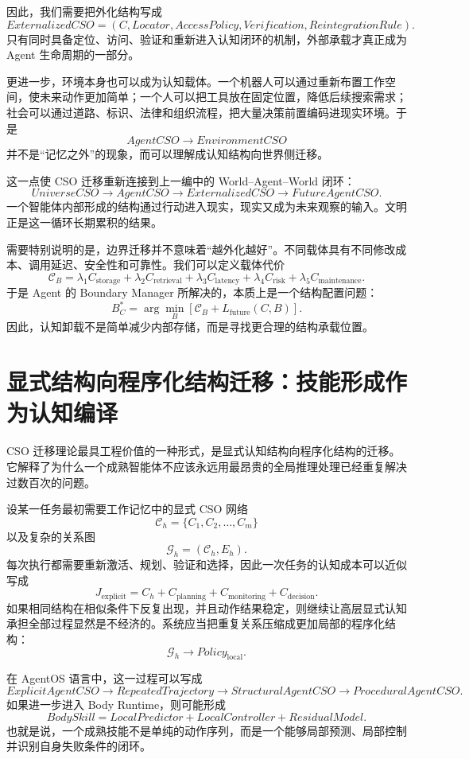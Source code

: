 因此，我们需要把外化结构写成
\[
ExternalizedCSO
=
(C,
Locator,
AccessPolicy,
Verification,
ReintegrationRule).
\]
只有同时具备定位、访问、验证和重新进入认知闭环的机制，外部承载才真正成为 Agent 生命周期的一部分。

更进一步，环境本身也可以成为认知载体。一个机器人可以通过重新布置工作空间，使未来动作更加简单；一个人可以把工具放在固定位置，降低后续搜索需求；社会可以通过道路、标识、法律和组织流程，把大量决策前置编码进现实环境。于是
\[
AgentCSO
\rightarrow
EnvironmentCSO
\]
并不是“记忆之外”的现象，而可以理解成认知结构向世界侧迁移。

这一点使 CSO 迁移重新连接到上一编中的 World--Agent--World 闭环：
\[
UniverseCSO
\rightarrow
AgentCSO
\rightarrow
ExternalizedCSO
\rightarrow
FutureAgentCSO.
\]
一个智能体内部形成的结构通过行动进入现实，现实又成为未来观察的输入。文明正是这一循环长期累积的结果。

需要特别说明的是，边界迁移并不意味着“越外化越好”。不同载体具有不同修改成本、调用延迟、安全性和可靠性。我们可以定义载体代价
\[
\mathcal C_B
=
\lambda_1 C_{\mathrm{storage}}
+
\lambda_2 C_{\mathrm{retrieval}}
+
\lambda_3 C_{\mathrm{latency}}
+
\lambda_4 C_{\mathrm{risk}}
+
\lambda_5 C_{\mathrm{maintenance}}.
\]
于是 Agent 的 Boundary Manager 所解决的，本质上是一个结构配置问题：
\[
B_C^\ast
=
\arg\min_B
\left[
\mathcal C_B
+
L_{\mathrm{future}}(C,B)
\right].
\]
因此，认知卸载不是简单减少内部存储，而是寻找更合理的结构承载位置。


\section{显式结构向程序化结构迁移：技能形成作为认知编译}

CSO 迁移理论最具工程价值的一种形式，是显式认知结构向程序化结构的迁移。它解释了为什么一个成熟智能体不应该永远用最昂贵的全局推理处理已经重复解决过数百次的问题。

设某一任务最初需要工作记忆中的显式 CSO 网络
\[
\mathcal C_h
=
\{C_1,C_2,\ldots,C_m\}
\]
以及复杂的关系图
\[
\mathcal G_h
=
(\mathcal C_h,E_h).
\]
每次执行都需要重新激活、规划、验证和选择，因此一次任务的认知成本可以近似写成
\[
J_{\mathrm{explicit}}
=
C_h
+
C_{\mathrm{planning}}
+
C_{\mathrm{monitoring}}
+
C_{\mathrm{decision}}.
\]
如果相同结构在相似条件下反复出现，并且动作结果稳定，则继续让高层显式认知承担全部过程显然是不经济的。系统应当把重复关系压缩成更加局部的程序化结构：
\[
\mathcal G_h
\longrightarrow
Policy_{\mathrm{local}}.
\]

在 AgentOS 语言中，这一过程可以写成
\[
ExplicitAgentCSO
\rightarrow
RepeatedTrajectory
\rightarrow
StructuralAgentCSO
\rightarrow
ProceduralAgentCSO.
\]
如果进一步进入 Body Runtime，则可能形成
\[
BodySkill
=
LocalPredictor
+
LocalController
+
ResidualModel.
\]
也就是说，一个成熟技能不是单纯的动作序列，而是一个能够局部预测、局部控制并识别自身失败条件的闭环。


